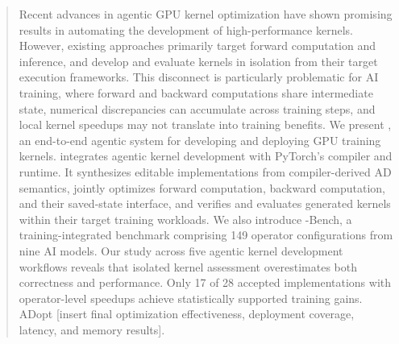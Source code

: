 \begin{abstract}
Recent advances in agentic GPU kernel optimization have shown promising results in automating the development of high-performance kernels. However, existing approaches primarily target forward computation and inference, and develop and evaluate kernels in isolation from their target execution frameworks. This disconnect is particularly problematic for AI training, where forward and backward computations share intermediate state, numerical discrepancies can accumulate across training steps, and local kernel speedups may not translate into training benefits.
We present \system, an end-to-end agentic system for developing and deploying GPU training kernels. \system integrates agentic kernel development with PyTorch's compiler and runtime. It synthesizes editable implementations from compiler-derived AD semantics, jointly optimizes forward computation, backward computation, and their saved-state interface, and verifies and evaluates generated kernels within their target training workloads.
We also introduce \system-Bench, a training-integrated benchmark comprising 149 operator configurations from nine AI models. Our study across five agentic kernel development workflows reveals that isolated kernel assessment overestimates both correctness and performance. Only 17 of 28 accepted implementations with operator-level speedups achieve statistically supported training gains. ADopt [insert final optimization effectiveness, deployment coverage, latency, and memory results].
\end{abstract}


